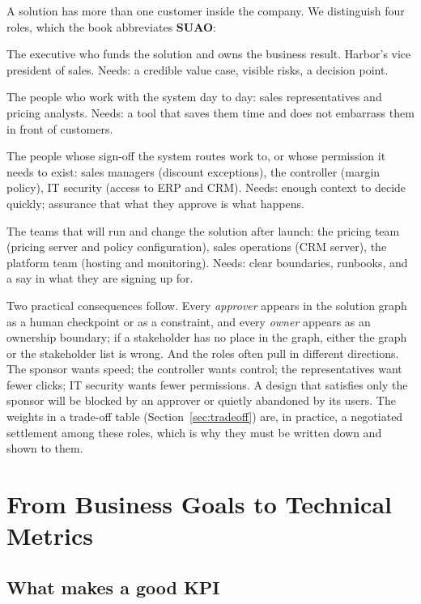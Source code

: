 A solution has more than one customer inside the company. We distinguish four roles, which the book abbreviates \textbf{SUAO}:
\begin{description}[leftmargin=1em,itemsep=2pt]
  \item[Sponsor.] The executive who funds the solution and owns the business result. Harbor's vice president of sales. Needs: a credible value case, visible risks, a decision point.
  \item[Users.] The people who work with the system day to day: sales representatives and pricing analysts. Needs: a tool that saves them time and does not embarrass them in front of customers.
  \item[Approvers.] The people whose sign-off the system routes work to, or whose permission it needs to exist: sales managers (discount exceptions), the controller (margin policy), IT security (access to ERP and CRM). Needs: enough context to decide quickly; assurance that what they approve is what happens.
  \item[Owners.] The teams that will run and change the solution after launch: the pricing team (pricing server and policy configuration), sales operations (CRM server), the platform team (hosting and monitoring). Needs: clear boundaries, runbooks, and a say in what they are signing up for.
\end{description}

Two practical consequences follow. Every \emph{approver} appears in the solution graph as a human checkpoint or as a constraint, and every \emph{owner} appears as an ownership boundary; if a stakeholder has no place in the graph, either the graph or the stakeholder list is wrong. And the roles often pull in different directions. The sponsor wants speed; the controller wants control; the representatives want fewer clicks; IT security wants fewer permissions. A design that satisfies only the sponsor will be blocked by an approver or quietly abandoned by its users. The weights in a trade-off table (Section~\ref{sec:tradeoff}) are, in practice, a negotiated settlement among these roles, which is why they must be written down and shown to them.

\section{From Business Goals to Technical Metrics}
\label{sec:kpis}

\subsection{What makes a good KPI}

